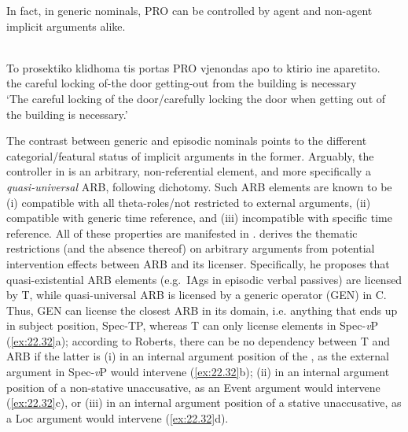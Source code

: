 \documentclass[output=paper]{langsci/langscibook}
\begin{document}
In fact, in generic nominals, PRO can be controlled by agent and non-agent
implicit arguments alike.

\ea%
    \label{ex:22.32n} \\
    \gll    To prosektiko klidhoma tis portas PRO vjenondas apo to ktirio ine aparetito.\\
            the	careful locking of-the door {} getting-out from the building is necessary\\
    \glt    \enquote*{The careful locking of the door/carefully locking the
    door when getting out of the building is necessary.}
\z

The contrast between generic and episodic nominals points to the different
categorial/featural status of implicit arguments in the former. Arguably, the
controller in  is an arbitrary, non-referential element, and
more specifically a \emph{quasi-universal} ARB, following 
dichotomy. Such ARB elements are known to be (i) compatible with all
theta-roles/not restricted to external arguments, (ii) compatible with generic
time reference, and (iii) incompatible with specific time reference. All of
these properties are manifested in . \citet{Roberts2014b}
derives the thematic restrictions (and the absence thereof) on arbitrary
arguments from potential intervention effects between ARB and its licenser.
Specifically, he proposes that quasi-existential ARB elements (e.g.\ \glspl{IAg} in
episodic verbal passives) are licensed by T, while quasi-universal ARB is
licensed by a generic operator (GEN) in C. Thus, GEN can license the closest
ARB in its domain, i.e.  anything that ends up in subject position, Spec-TP,
whereas T can only license elements in Spec-\emph{v}P (\ref{ex:22.32}a);
according to Roberts, there can be no dependency between T and ARB if the
latter is (i) in an internal argument position of the , as the external
argument in Spec-\emph{v}P would intervene (\ref{ex:22.32}b); (ii) in an
internal argument position of a non-stative unaccusative, as an Event argument
would intervene (\ref{ex:22.32}c), or (iii) in an internal argument position of
a stative unaccusative, as a Loc argument would intervene (\ref{ex:22.32}d).

\ea%
    \label{ex:22.32} \textcite[5]{Roberts2014b}
    \ea[]{T\tss{i} [\tss{\emph{v}P}  arb\tss{i}  [VP \dots}
    \ex[*]{T\tss{i} [\tss{\emph{v}P} \gls{EA} [\tss{VP} \dots{} arb\tss{i} \dots{}}
    \ex[*]{T\tss{i} \dots{} Ev \dots{} [\tss{VP} \dots{} arb\tss{i} \dots{}}
    \ex[*]{T\tss{i} \dots{} Loc \dots{}  [\tss{VP} \dots{} arb\tss{i} \dots{}}
    \z
\z
\end{document}
